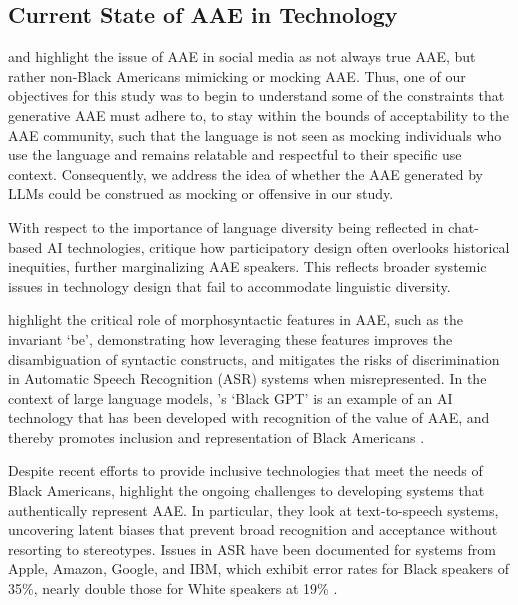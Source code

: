 \subsection*{Current State of AAE in Technology}

\citet{hill1998language} and \citet{smokoski2016voicing} highlight the issue of AAE in social media as not always true AAE, but rather non-Black Americans mimicking or mocking AAE. Thus, one of our objectives for this study was to begin to understand some of the constraints that generative AAE must adhere to, to stay within the bounds of acceptability to the AAE community, such that the language is not seen as mocking individuals who use the language and remains relatable and respectful to their specific use context. Consequently, we address the idea of whether the AAE generated by LLMs could be construed as mocking or offensive in our study.



With respect to the importance of language diversity being reflected in chat-based AI technologies, \citet{Harrington2019DeconstructingCC} critique how participatory design often overlooks historical inequities, further marginalizing AAE speakers. This reflects broader systemic issues in technology design that fail to accommodate linguistic diversity. 

\citet{santiago2022disambiguation} highlight the critical role of morphosyntactic features in AAE, such as the invariant `be', demonstrating how leveraging these features improves the disambiguation of syntactic constructs, and mitigates the risks of discrimination in Automatic Speech Recognition (ASR) systems when misrepresented. In the context of large language models, \citet{HYFIN}'s `Black GPT' is an example of an AI technology that has been developed with recognition of the value of AAE, and thereby promotes inclusion and representation of Black Americans %
\cite{previlon-etal-2024-leveraging-syntactic}.

Despite recent efforts to provide inclusive technologies that meet the needs of Black Americans, \citet{pinhanez2024creating} highlight the ongoing challenges to developing systems that authentically represent AAE. In particular, they look at text-to-speech systems, uncovering latent biases that prevent broad recognition and acceptance without resorting to stereotypes. Issues in ASR have been documented for systems from Apple, Amazon, Google, and IBM, which exhibit error rates for Black speakers of 35\%, nearly double those for White speakers at 19\% \cite{Koenecke2020}.

